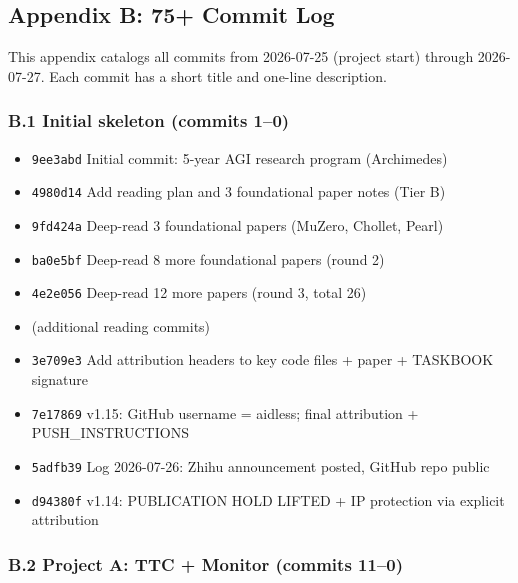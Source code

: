 \documentclass[11pt]{article}
\begin{document}
\subsection{Appendix B: 75+ Commit Log}

This appendix catalogs all commits from 2026-07-25 (project start) through
2026-07-27. Each commit has a short title and one-line description.

\subsubsection{B.1 Initial skeleton (commits 1--0)}

\begin{itemize}
  \item \texttt{9ee3abd} Initial commit: 5-year AGI research program (Archimedes)
  \item \texttt{4980d14} Add reading plan and 3 foundational paper notes (Tier B)
  \item \texttt{9fd424a} Deep-read 3 foundational papers (MuZero, Chollet, Pearl)
  \item \texttt{ba0e5bf} Deep-read 8 more foundational papers (round 2)
  \item \texttt{4e2e056} Deep-read 12 more papers (round 3, total 26)
  \item (additional reading commits)
  \item \texttt{3e709e3} Add attribution headers to key code files + paper + TASKBOOK signature
  \item \texttt{7e17869} v1.15: GitHub username = aidless; final attribution + PUSH\_INSTRUCTIONS
  \item \texttt{5adfb39} Log 2026-07-26: Zhihu announcement posted, GitHub repo public
  \item \texttt{d94380f} v1.14: PUBLICATION HOLD LIFTED + IP protection via explicit attribution
\end{itemize}


\subsubsection{B.2 Project A: TTC + Monitor (commits 11--0)}
\end{document}
